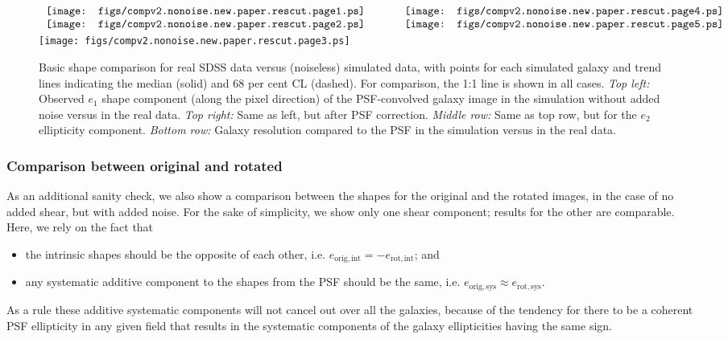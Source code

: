 \documentclass[twocolumn,useAMS,usenatbib]{mn2e}
\begin{document}
\begin{figure*}
\begin{center}
$\begin{array}{c@{\hspace{0.5in}}c}
\texttt{[image: figs/compv2.nonoise.new.paper.rescut.page1.ps]} & 
\texttt{[image: figs/compv2.nonoise.new.paper.rescut.page4.ps]} \\
\texttt{[image: figs/compv2.nonoise.new.paper.rescut.page2.ps]} & 
\texttt{[image: figs/compv2.nonoise.new.paper.rescut.page5.ps]} \\
\end{array}$
\texttt{[image: figs/compv2.nonoise.new.paper.rescut.page3.ps]} 
\caption{\label{F:basicsimresults}Basic shape comparison for real SDSS
  data versus (noiseless) simulated data, with points for each simulated galaxy
  and trend lines indicating the median (solid) and $68$ per cent CL
  (dashed).  For comparison, the 1:1 line is shown in all cases.  {\em Top left:} Observed
  $e_1$ shape component (along the pixel direction) of the
  PSF-convolved galaxy image in the simulation without added noise versus in the real
  data.  {\em Top right:} Same as left, but after PSF correction.
  {\em Middle row:} Same as top row, but for the $e_2$ ellipticity
  component.  {\em Bottom row:} Galaxy resolution compared to the PSF
  in the simulation versus in the real data.}
\end{center}
\end{figure*}

\subsubsection{Comparison between original and rotated}

As an additional sanity check, we also show a comparison between the
shapes for the original and the rotated images, in the case of no
added shear, but with added noise.  For the sake of simplicity, we show only one shear
component; results for the other are comparable.  Here, we rely on the
fact that
\begin{itemize}
\item the intrinsic shapes should be the opposite of each other,
  i.e. $e_{\mathrm{orig, int}} = -e_{\mathrm{rot,int}}$; and
\item any systematic additive component to the shapes from the PSF
  should be the same, i.e. $e_{\mathrm{orig, sys}} \approx e_{\mathrm{rot,sys}}$.
\end{itemize}
As a rule these additive systematic components will not cancel out
over all the galaxies, because of the tendency for there to be a
coherent PSF ellipticity in any given field that results in the
systematic components of the galaxy ellipticities having the same sign.
\end{document}
